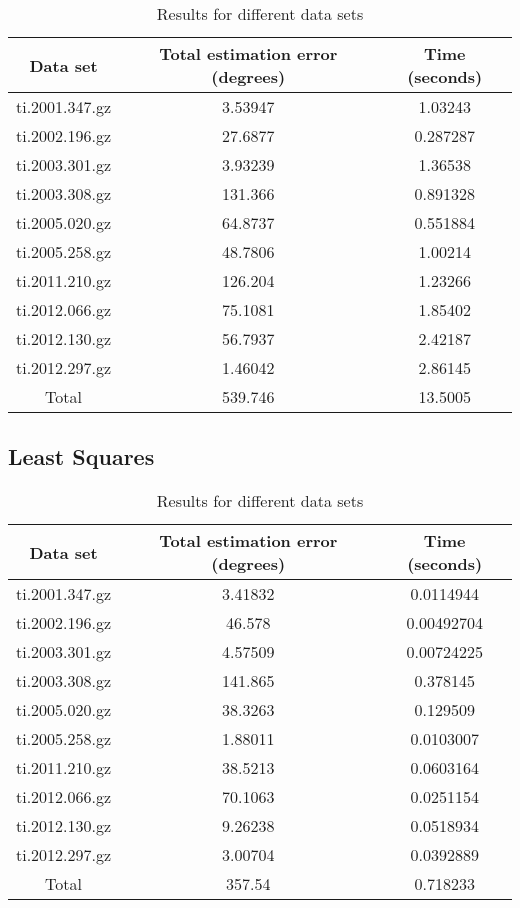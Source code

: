 \begin{table}[h!]
   	\centering
   	\def\arraystretch{1.2}
   	\begin{tabular}{|c c c|} 
   		\hline
   		Data set & Total estimation error (degrees) & Time (seconds) \\ [0.5ex] 
   		\hline\hline
   		ti.2001.347.gz & 3.53947 & 1.03243 \\
   		\hline
   		ti.2002.196.gz & 27.6877 & 0.287287 \\
   		\hline
   		ti.2003.301.gz & 3.93239 & 1.36538 \\
   		\hline
   		ti.2003.308.gz & 131.366 & 0.891328 \\
   		\hline
   		ti.2005.020.gz & 64.8737 & 0.551884 \\
   		\hline
   		ti.2005.258.gz & 48.7806 & 1.00214 \\
   		\hline
   		ti.2011.210.gz & 126.204 & 1.23266 \\
   		\hline
   		ti.2012.066.gz & 75.1081 & 1.85402 \\
   		\hline
   		ti.2012.130.gz & 56.7937 & 2.42187 \\
   		\hline
   		ti.2012.297.gz & 1.46042 & 2.86145 \\
   		\hline
   		\hline
   		Total & 539.746 & 13.5005 \\
   		\hline
   	\end{tabular}
   	\caption{Results for different data sets}
\end{table}

\subsection{Least Squares}

\begin{table}[h!]
   	\centering
   	\def\arraystretch{1.2}
   	\begin{tabular}{|c c c|} 
   		\hline
   		Data set & Total estimation error (degrees) & Time (seconds) \\ [0.5ex] 
   		\hline\hline
   		ti.2001.347.gz & 3.41832 & 0.0114944 \\
   		\hline
   		ti.2002.196.gz & 46.578 & 0.00492704 \\
   		\hline
   		ti.2003.301.gz & 4.57509 & 0.00724225 \\
   		\hline
   		ti.2003.308.gz & 141.865 & 0.378145 \\
   		\hline
   		ti.2005.020.gz & 38.3263 & 0.129509 \\
   		\hline
   		ti.2005.258.gz & 1.88011 & 0.0103007 \\
   		\hline
   		ti.2011.210.gz & 38.5213 & 0.0603164 \\
   		\hline
   		ti.2012.066.gz & 70.1063 & 0.0251154 \\
   		\hline
   		ti.2012.130.gz & 9.26238 & 0.0518934 \\
   		\hline
   		ti.2012.297.gz & 3.00704 & 0.0392889 \\
   		\hline\hline
   		Total & 357.54 & 0.718233 \\
   		\hline
   	\end{tabular}
   	\caption{Results for different data sets}\label{tab:lsDirect}
\end{table}

